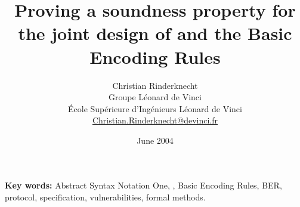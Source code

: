 \documentclass[11pt]{article}
\title{Proving a soundness property for the joint design of \ASN and
  the Basic Encoding Rules}
\author{Christian Rinderknecht\\
Groupe L\'eonard de Vinci\\
\'Ecole Sup\'erieure d'Ing\'enieurs L\'eonard de Vinci\\
{\small\url{Christian.Rinderknecht@devinci.fr}}
}
\date{June 2004}
\theoremstyle{plain}
\begin{document}
\maketitle



\noindent\textbf{Key words:} Abstract Syntax Notation One, \ASN, Basic
Encoding Rules, BER, protocol, specification, vulnerabilities, formal
methods.










\end{document}
